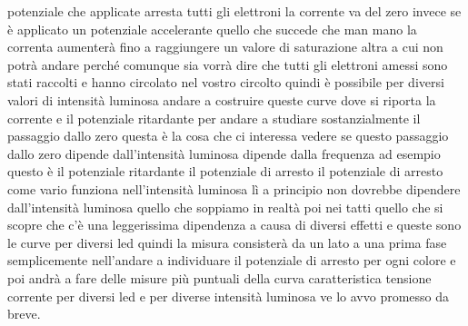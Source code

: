 potenziale che applicate arresta tutti gli elettroni la corrente va del zero invece se è applicato un potenziale accelerante quello che succede che man mano la correnta aumenterà fino a raggiungere un valore di saturazione altra a cui non potrà andare perché comunque sia vorrà dire che tutti gli elettroni amessi sono stati raccolti e hanno circolato nel vostro circolto quindi è possibile per diversi valori di intensità luminosa andare a costruire queste curve dove si riporta la corrente e il potenziale ritardante per andare a studiare sostanzialmente il passaggio dallo zero questa è la cosa che ci interessa vedere se questo passaggio dallo zero dipende dall'intensità luminosa dipende dalla frequenza ad esempio questo è il potenziale ritardante il potenziale di arresto il potenziale di arresto come vario funziona nell'intensità luminosa lì a principio non dovrebbe dipendere dall'intensità luminosa quello che soppiamo in realtà poi nei tatti quello che si scopre che c'è una leggerissima dipendenza a causa di diversi effetti e queste sono le curve per diversi led quindi la misura consisterà da un lato a una prima fase semplicemente nell'andare a individuare il potenziale di arresto per ogni colore e poi andrà a fare delle misure più puntuali della curva caratteristica tensione corrente per diversi led e per diverse intensità luminosa ve lo avvo promesso da breve.